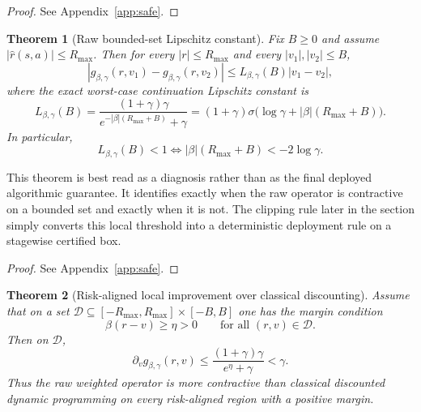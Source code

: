 \documentclass{article}
\newtheorem{theorem}{Theorem}[section]
\theoremstyle{remark}
\newcommand{\gbg}{g_{\beta,\gamma}}
\newcommand{\bgL}[1]{L_{\beta,\gamma}(#1)}
\begin{document}
\begin{proof}
See Appendix~\ref{app:safe}.
\end{proof}

\begin{theorem}[Raw bounded-set Lipschitz constant]
\label{thm:lse-contraction}
Fix $B\ge 0$ and assume $|\hat r(s,a)|\le R_{\max}$.
Then for every $|r|\le R_{\max}$ and every $|v_1|,|v_2|\le B$,
\begin{equation}
|\gbg(r,v_1)-\gbg(r,v_2)| \le \bgL{B}|v_1-v_2|,
\label{eq:raw-lipschitz}
\end{equation}
where the exact worst-case continuation Lipschitz constant is
\begin{equation}
\bgL{B}
=
\frac{(1+\gamma)\gamma}{e^{-|\beta|(R_{\max}+B)}+\gamma}
=
(1+\gamma)\sigma\!\bigl(\log\gamma + |\beta|(R_{\max}+B)\bigr).
\label{eq:contraction-bound}
\end{equation}
In particular,
\begin{equation}
\bgL{B}<1
\iff
|\beta|(R_{\max}+B)<-2\log\gamma.
\label{eq:expansive-threshold}
\end{equation}
\end{theorem}

This theorem is best read as a diagnosis rather than as the final deployed algorithmic guarantee.
It identifies exactly when the raw operator is contractive on a bounded set and exactly when it is not.
The clipping rule later in the section simply converts this local threshold into a deterministic deployment rule on a stagewise certified box.

\begin{proof}
See Appendix~\ref{app:safe}.
\end{proof}

\begin{theorem}[Risk-aligned local improvement over classical discounting]
\label{thm:aligned-contraction}
Assume that on a set $\mathcal D\subseteq[-R_{\max},R_{\max}]\times[-B,B]$ one has the margin condition
\[
\beta(r-v)\ge \eta>0
\qquad\text{for all }(r,v)\in\mathcal D.
\]
Then on $\mathcal D$,
\begin{equation}
\partial_v\gbg(r,v)
\le
\frac{(1+\gamma)\gamma}{e^{\eta}+\gamma}
<\gamma.
\label{eq:improved-local-modulus}
\end{equation}
Thus the raw weighted operator is more contractive than classical discounted dynamic programming on every risk-aligned region with a positive margin.
\end{theorem}
\end{document}
